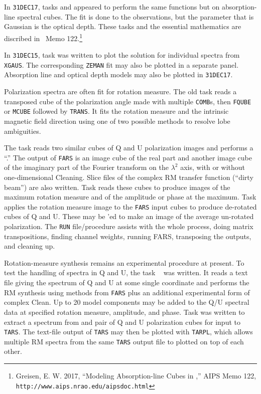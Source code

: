      In {\tt 31DEC17}, tasks {\tt {}} and {\tt {}}
appeared to perform the same functions but on absorption-line spectral
cubes.  The fit is done to the observations, but the parameter that is
Gaussian is the optical depth.  These tasks and the essential
mathematics are discribed in \AIPS\ Memo 122.\footnote{Greisen, E. W.
2017, ``Modeling Absorption-line Cubes in \AIPS,'' AIPS Memo 122, {\tt
http://www.aips.nrao.edu/aipsdoc.html}}

     In {\tt 31DEC15}, task {\tt {}} was written to plot the
solution for individual spectra from {\tt XGAUS}\@.  The corresponding
{\tt ZEMAN} fit may also be plotted in a separate panel.  Absorption
line and optical depth models may also be plotted in {\tt 31DEC17}\@.

     Polarization spectra are often fit for rotation measure.  The
old task {\tt {}} reads a transposed cube of the polarization
angle made with multiple {\tt COMB}s, then {\tt FQUBE} or {\tt MCUBE}
followed by {\tt TRANS}.  It fits the rotation measure and the
intrinsic magnetic field direction using one of two possible methods
to resolve lobe ambiguities.

     The task {\tt {}} reads two similar cubes of Q and U
polarization images and performs a ``.''  The output of {\tt FARS} is an image cube of the real
part and another image cube of the imaginary part of the Fourier
transform on the $\lambda^2$ axis, with or without one-dimensional
Cleaning.  Slice files of the complex RM transfer function (``dirty
beam'') are also written.  Task {\tt {}} reads these cubes
to produce images of the maximum rotation measure and of the amplitude
or phase at the maximum.  Task {\tt {}} applies the rotation
measure image to the {\tt FARS} input cubes to produce de-rotated
cubes of Q and U.  These may be {\tt {}}'ed to make an image
of the average un-rotated polarization.  The {\tt RUN} file/procedure
{\tt {}} assists with the whole process, doing matrix
transpositions, finding channel weights, running FARS, transposing the
outputs, and cleaning up.

     Rotation-measure synthesis remains an experimental procedure at
present.  To test the handling of spectra in Q and U, the task {\tt
{}} was written.  It reads a text file giving the spectrum of
Q and U at some single coordinate and performs the RM synthesis using
methods from {\tt FARS} plus an additional experimental form of
complex Clean.  Up to 20 model components may be added to the Q/U
spectral data at specified rotation measure, amplitude, and phase.
Task {\tt {}} was written to extract a spectrum from and
pair of Q and U polarization cubes for input to {\tt TARS}\@.  The
text-file output of {\tt TARS} may then be plotted with {\tt TARPL},
which allows multiple RM spectra from the same {\tt TARS} output file
to plotted on top of each other.

